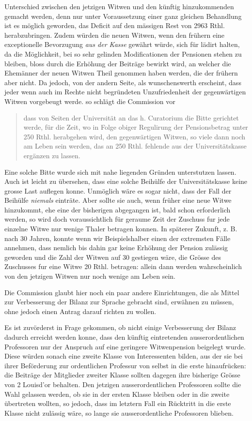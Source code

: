 Unterschied zwischen den jetzigen Witwen und den künftig hinzukommenden gemacht werden, denn nur unter Voraussetzung einer ganz gleichen Behandlung ist es möglich geworden, das Deficit auf den mässigen Rest von 2963 Rthl. herabzubringen. Zudem würden die neuen Witwen, wenn den frühern eine exceptionelle Bevorzugung \textit{aus der Kasse} gewährt würde, sich für lädirt halten, da die Möglichkeit, bei so sehr gelinden Modificationen der Pensionen stehen zu bleiben, bloss durch die Erhöhung der Beiträge bewirkt wird, an welcher die Ehemänner der neuen Witwen Theil genommen haben werden, die der frühern aber nicht. Da jedoch, von der andern Seite, als wunschenswerth erscheint, dass jeder wenn auch im Rechte nicht begründeten Unzufriedenheit der gegenwärtigen Witwen vorgebeugt werde. so schlägt die Commission vor
\begin{quote}
dass von Seiten der Universität an das h. Curatorium die Bitte gerichtet werde, für die Zeit, wo in Folge obiger Regulirung der Pensionsbetrag unter 250 Rthl. herabgehen wird, den gegenwärtigen Witwen, so viele dann noch am Leben sein werden, das an 250 Rthl. fehlende aus der Universitätskasse ergänzen zu lassen.
\end{quote}
\noindent\hspace*{\parindent}Eine solche Bitte wurde sich mit nahe liegenden Gründen unterstutzen lassen. Auch ist leicht zu übersehen, dass eine solche Beihülfe der Universitätskasse keine grosse Last auflegen konne. Unmöglich wäre es sogar nicht, dass der Fall der Beihülfe \textit{niemals} einträte. Aber sollte sie auch, wenn früher eine neue Witwe hinzukommt, ehe eine der bisherigen abgegangen ist, bald schon erforderlich werden, so wird doch voraussichtlich für geraume Zeit der Zuschuss fur jede einzelne Witwe nur wenige Thaler betragen konnen. In späterer Zukunft, z. B. nach 30 Jahren, konnte wenn wir Beispielshalber einen der extremsten Fälle annehmen, dass nemlich bis dahin gar keine Erhöhung der Pension zulässig geworden und die Zahl der Witwen auf 30 gestiegen wäre, die Grösse des Zuschusses fur eine Witwe 20 Rthl. betragen: allein dann werden wahrscheinlich von den jetzigen Witwen nur noch wenige am Leben sein.

Die Commission glaubt hier noch ein paar andere Einrichtungen, die als Mittel zur Verbesserung der Bilanz zur Sprache gebracht sind, erwähnen zu müssen, ohne jedoch einen Antrag darauf richten zu wollen.

Es ist zuvörderst in Frage gekommen, ob nicht einige Verbesserung der Bilanz dadurch erreicht werden konne, dass den künftig eintretenden ausserordentlichen Professoren nur der Anspruch auf eine geringere Witwenpension beigelegt wurde. Diese würden sonach eine zweite Klasse von Interessenten bilden, aus der sie bei ihrer Beförderung zur ordentlichen Professur von selbst in die erste hinaufrücken: die Beiträge der Mitglieder zweiter Klasse sollten dagegen ihre bisherige Grösse von 2 Louisd’or behalten. Den jetzigen ausserordentlichen Professoren sollte die Wahl gelassen werden, ob sie in der ersten Klasse bleiben oder in die zweite übertreten wollten, so jedoch, dass im letztern Fall ein Rücktritt in die erste Klasse nicht zulässig wäre, so lange sie ausserordentliche Professoren blieben.

